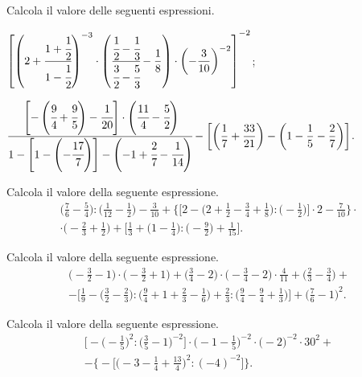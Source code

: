 \begin{esercizio}[\Ast]%
 Calcola il valore delle seguenti espressioni.
\begin{enumeratea}
\item $\displaystyle{\left[\left(2+\cfrac{1+\cfrac{1}{2}}{1-\cfrac{1}{2}}\right)^{-3}\cdot\left(\cfrac{\cfrac{1}{2}-\cfrac{1}{3}}%
{\cfrac{3}{2}-\cfrac{5}{3}}-\frac{1}{8}\right)\cdot\left(-{\frac{3}{10}}\right)^{-2}\right]^{-2}}$;
\item $\displaystyle{\cfrac{\left[-\left(\cfrac{9}{4}+\cfrac{9}{5}\right)-\cfrac{1}{20}\right]\cdot\left(\cfrac{11}{4}-\cfrac{5}{2}\right)}%
{1-\left[1-\left(-{\cfrac{17}{7}}\right)\right]-\left(-1+\cfrac{2}{7}-\cfrac{1}{14}\right)}%
-\bigg[\bigg(\frac{1}{7}+\frac{33}{21}\bigg)-\bigg(1-\frac{1}{5}-\frac{2}{7}\bigg)\bigg]}$.

\end{enumeratea}
\end{esercizio}

\begin{esercizio}[\Ast]%
 Calcola il valore della seguente espressione.
\begin{multline*}
\bigg(\frac{7}{6}-\frac{5}{4}\bigg):\bigg(\frac{1}{12}-\frac{1}{2}\bigg)-\frac{3}{10}+\bigg\{\bigg[2-\bigg(2+\frac{1}{2}%
-\frac{3}{4}+\frac{1}{8}\bigg):\bigg(-{\frac{1}{2}}\bigg)\bigg]\cdot2-\frac{7}{10}\bigg\}\cdot\\
\cdot\bigg(-{\frac{2}{3}}+\frac{1}{2}\bigg)%
+\bigg[\frac{1}{3}+\bigg(1-\frac{1}{4}\bigg):\bigg(-{\frac{9}{2}}\bigg)+\frac{1}{15}\bigg].
\end{multline*}
\end{esercizio}

\begin{esercizio}[\Ast]%
 Calcola il valore della seguente espressione.
\begin{multline*}
\bigg(-{\frac{3}{2}}-1\bigg)\cdot%
\bigg(-{\frac{3}{2}}+1\bigg)+\bigg(\frac{3}{4}-2\bigg)\cdot%
\bigg(-{\frac{3}{4}}-2\bigg)\cdot {\frac{4}{11}}+\bigg(\frac{2}{3}-\frac{3}{4}\bigg)+\\%
-\bigg[\frac{1}{9}-\bigg(\frac{3}{2}-\frac{2}{3}\bigg):\bigg(\frac{9}{4}+1+%
\frac{2}{3}-\frac{1}{6}\bigg)+\frac{2}{3}:\bigg(\frac{9}{4}-\frac{9}{4}%
+\frac{1}{3}\bigg)\bigg]+\bigg(\frac{7}{6}-1\bigg)^{2}.
\end{multline*}
\end{esercizio}

\begin{esercizio}[\Ast]%
 Calcola il valore della seguente espressione.
\begin{multline*}
\bigg[-\bigg(-{\frac{1}{5}}\bigg)^{2}:\bigg(\frac{3}{5}-1\bigg)^{-2}\bigg]\cdot%
\bigg(-1-\frac{1}{5}\bigg)^{-2}\cdot \bigg(-2\bigg)^{-2}\cdot30^{2}+\\%
-\bigg\{-\bigg[\bigg(-3-\frac{1}{4}+\frac{13}{4}\bigg)^{2}:(-4)^{-2}\bigg]\bigg\}.
\end{multline*}
\end{esercizio}

